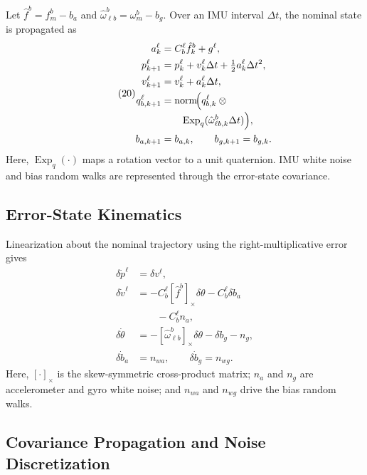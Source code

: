 \documentclass[]{IAC_style}
\begin{document}
Let $\hat f^b=f_m^b-b_a$ and $\hat\omega_{\ell b}^b=\omega_m^b-b_g$. Over an IMU interval $\Delta t$, the nominal state is propagated as
\begin{equation}
\tag{20}\label{eq:20}
\begin{aligned}
a_k^\ell&=C_b^\ell\hat f_k^b+g^\ell,\\
p_{k+1}^\ell&=p_k^\ell+v_k^\ell\Delta t
  +\tfrac12a_k^\ell\Delta t^2,\\
v_{k+1}^\ell&=v_k^\ell+a_k^\ell\Delta t,\\
q_{b,k+1}^\ell
  &=\operatorname{norm}\!\Bigl(q_{b,k}^\ell\otimes{}\\[-2pt]
  &\qquad \operatorname{Exp}_q(\hat\omega_{\ell b,k}^b\Delta t)\Bigr),\\
b_{a,k+1}&=b_{a,k},\qquad b_{g,k+1}=b_{g,k}.
\end{aligned}
\end{equation}
Here, $\operatorname{Exp}_q(\cdot)$ maps a rotation vector to a unit quaternion. IMU white noise and bias random walks are represented through the error-state covariance.

\subsection{Error-State Kinematics}

Linearization about the nominal trajectory using the right-multiplicative error gives
\begin{equation}
\tag{21}\label{eq:21}
\begin{aligned}
\delta\dot p^\ell&=\delta v^\ell,\\
\delta\dot v^\ell
  &=-C_b^\ell[\hat f^b]_\times\delta\theta-C_b^\ell\delta b_a\\
  &\qquad{}-C_b^\ell n_a,\\
\delta\dot\theta
  &=-[\hat\omega_{\ell b}^b]_\times\delta\theta-\delta b_g-n_g,\\
\delta\dot b_a&=n_{wa},\qquad\delta\dot b_g=n_{wg}.
\end{aligned}
\end{equation}
Here, $[\cdot]_\times$ is the skew-symmetric cross-product matrix; $n_a$ and $n_g$ are accelerometer and gyro white noise; and $n_{wa}$ and $n_{wg}$ drive the bias random walks.

\subsection{Covariance Propagation and Noise Discretization}
\end{document}
